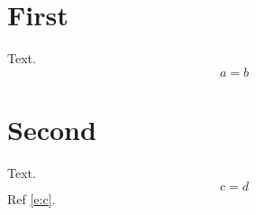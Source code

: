 \documentclass[10pt]{article}
\numberwithin{equation}{section}
\begin{document}
\section{First}
Text.
\begin{equation} a = b \end{equation}
\section{Second}
Text.
\begin{equation} c = d \label{e:c} \end{equation}
Ref \eqref{e:c}.
\end{document}
